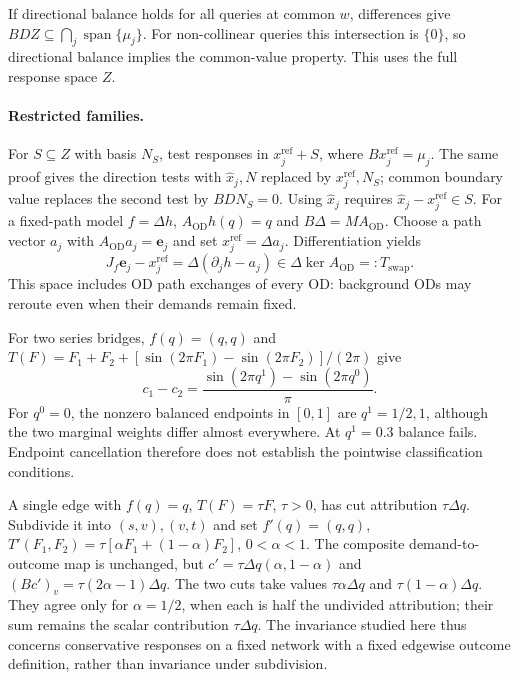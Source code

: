 If directional balance holds for all
queries at common $w$, differences give
$BDZ\subseteq\bigcap_j\operatorname{span}\{\mu_j\}$. For non-collinear
queries this intersection is $\{0\}$, so directional balance implies
the common-value property. This uses the full response space $Z$.

\paragraph{Restricted families.}\label{app:membership}
For $S\subseteq Z$ with basis $N_S$, test responses in
$x_j^{\mathrm{ref}}+S$, where $Bx_j^{\mathrm{ref}}=\mu_j$.
The same proof gives the direction tests with $\hat x_j,N$ replaced
by $x_j^{\mathrm{ref}},N_S$; common boundary value replaces the second test by
$BDN_S=0$. Using $\hat x_j$ requires
$\hat x_j-x_j^{\mathrm{ref}}\in S$. For a fixed-path model $f=\Delta h$,
$A_{\mathrm{OD}}h(q)=q$ and $B\Delta=MA_{\mathrm{OD}}$. Choose a path
vector $a_j$ with $A_{\mathrm{OD}}a_j=\mathbf e_j$ and set
$x_j^{\mathrm{ref}}=\Delta a_j$. Differentiation yields
\[
J_f\mathbf e_j-x_j^{\mathrm{ref}}
=\Delta(\partial_jh-a_j)\in\Delta\ker A_{\mathrm{OD}}=:T_{\mathrm{swap}}.
\]
This space includes OD path exchanges of every OD: background
ODs may reroute even when their demands remain fixed.

\begin{example}\label{ex:cancellation}
For two series bridges, $f(q)=(q,q)$ and
$T(F)=F_1+F_2+[\sin(2\pi F_1)-\sin(2\pi F_2)]/(2\pi)$ give
\[
c_1-c_2
=\frac{\sin(2\pi q^1)-\sin(2\pi q^0)}{\pi}.
\]
For $q^0=0$, the nonzero balanced endpoints in $[0,1]$ are
$q^1=1/2,1$, although the two marginal weights differ almost
everywhere. At $q^1=0.3$ balance fails. Endpoint cancellation therefore
does not establish the pointwise classification conditions.
\end{example}

\begin{example}\label{ex:subdivision}
A single edge with $f(q)=q$, $T(F)=\tau F$, $\tau>0$, has cut attribution
$\tau\Delta q$. Subdivide it into $(s,v),(v,t)$ and set
$f'(q)=(q,q)$,
$T'(F_1,F_2)=\tau[\alpha F_1+(1-\alpha)F_2]$, $0<\alpha<1$.
The composite demand-to-outcome map is unchanged, but
$c'=\tau\Delta q(\alpha,1-\alpha)$ and
$(Bc')_v=\tau(2\alpha-1)\Delta q$.
The two cuts take values $\tau\alpha\Delta q$ and
$\tau(1-\alpha)\Delta q$. They agree only for $\alpha=1/2$, when each
is half the undivided attribution; their sum remains the scalar
contribution $\tau\Delta q$. The invariance studied here thus concerns
conservative responses on a fixed network with a fixed edgewise
outcome definition, rather than invariance under subdivision.
\end{example}

